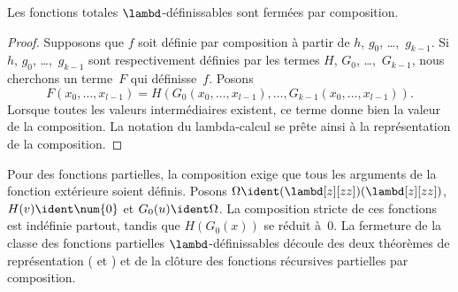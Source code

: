 \documentclass[../../../include/open-logic-section]{subfiles}
\begin{document}

\begin{lem}
Les fonctions totales $\lambd$-définissables sont
fermées par composition.
\end{lem}

\begin{proof}
Supposons que $f$ soit définie par composition
à partir de $h$, $g_0$, \dots,~$g_{k-1}$.
Si $h$, $g_0$, \dots,~$g_{k-1}$ sont respectivement
définies par les termes $H$, $G_0$, \dots,~$G_{k-1}$,
nous cherchons un terme~$F$ qui définisse~$f$.
Posons
\[
F(x_0, \dots, x_{l-1}) = H(G_0(x_0, \dots, x_{l-1}),
\dots, G_{k-1}(x_0, \dots, x_{l-1})).
\]
Lorsque toutes les valeurs intermédiaires existent,
ce terme donne bien la valeur de la composition.
La notation du lambda-calcul se prête ainsi
à la représentation de la composition.
\end{proof}

Pour des fonctions partielles, la composition exige que tous les
arguments de la fonction extérieure soient définis. Posons
$\Omega\ident(\lambd[z][zz])(\lambd[z][zz])$,
$H(v)\ident\num{0}$ et $G_0(u)\ident\Omega$.
La composition stricte de ces fonctions est indéfinie partout,
tandis que $H(G_0(x))$ se réduit à~$\num{0}$. La fermeture de la
classe des fonctions partielles $\lambd$-définissables découle
des deux théorèmes de représentation
( et
) et de la clôture
des fonctions récursives partielles par composition.
\end{document}
